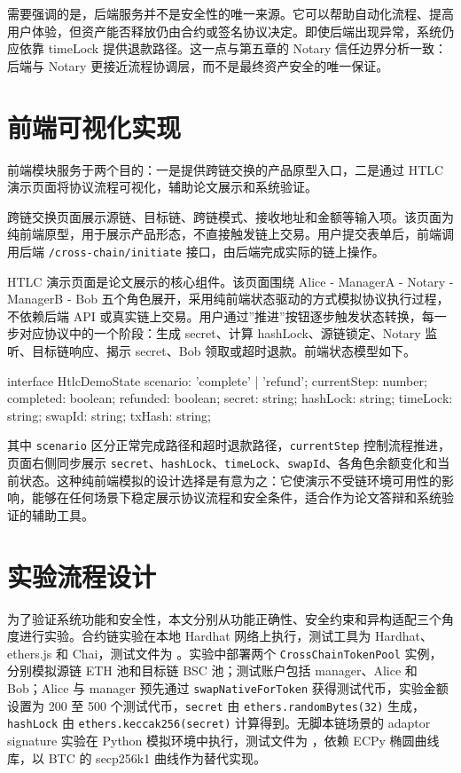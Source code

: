 需要强调的是，后端服务并不是安全性的唯一来源。它可以帮助自动化流程、提高用户体验，但资产能否释放仍由合约或签名协议决定。即使后端出现异常，系统仍应依靠 timeLock 提供退款路径。这一点与第五章的 Notary 信任边界分析一致：后端与 Notary 更接近流程协调层，而不是最终资产安全的唯一保证。


\section{前端可视化实现}


前端模块服务于两个目的：一是提供跨链交换的产品原型入口，二是通过 HTLC 演示页面将协议流程可视化，辅助论文展示和系统验证。

跨链交换页面展示源链、目标链、跨链模式、接收地址和金额等输入项。该页面为纯前端原型，用于展示产品形态，不直接触发链上交易。用户提交表单后，前端调用后端 \texttt{/cross-chain/initiate} 接口，由后端完成实际的链上操作。

HTLC 演示页面是论文展示的核心组件。该页面围绕 Alice - ManagerA - Notary - ManagerB - Bob 五个角色展开，采用纯前端状态驱动的方式模拟协议执行过程，不依赖后端 API 或真实链上交易。用户通过”推进”按钮逐步触发状态转换，每一步对应协议中的一个阶段：生成 secret、计算 hashLock、源链锁定、Notary 监听、目标链响应、揭示 secret、Bob 领取或超时退款。前端状态模型如下。


\begin{codeblock}
interface HtlcDemoState {
  scenario: 'complete' | 'refund';
  currentStep: number;
  completed: boolean;
  refunded: boolean;
  secret: string;
  hashLock: string;
  timeLock: string;
  swapId: string;
  txHash: string;
}
\end{codeblock}


其中 \texttt{scenario} 区分正常完成路径和超时退款路径，\texttt{currentStep} 控制流程推进，页面右侧同步展示 \texttt{secret}、\texttt{hashLock}、\texttt{timeLock}、\texttt{swapId}、各角色余额变化和当前状态。这种纯前端模拟的设计选择是有意为之：它使演示不受链环境可用性的影响，能够在任何场景下稳定展示协议流程和安全条件，适合作为论文答辩和系统验证的辅助工具。


\section{实验流程设计}


为了验证系统功能和安全性，本文分别从功能正确性、安全约束和异构适配三个角度进行实验。合约链实验在本地 Hardhat 网络上执行，测试工具为 Hardhat、ethers.js 和 Chai，测试文件为 。实验中部署两个 \texttt{CrossChainTokenPool} 实例，分别模拟源链 ETH 池和目标链 BSC 池；测试账户包括 manager、Alice 和 Bob；Alice 与 manager 预先通过 \texttt{swapNativeForToken} 获得测试代币，实验金额设置为 200 至 500 个测试代币，\texttt{secret} 由 \texttt{ethers.randomBytes(32)} 生成，\texttt{hashLock} 由 \texttt{ethers.keccak256(secret)} 计算得到。无脚本链场景的 adaptor signature 实验在 Python 模拟环境中执行，测试文件为 ，依赖 ECPy 椭圆曲线库，以 BTC 的 secp256k1 曲线作为替代实现。



